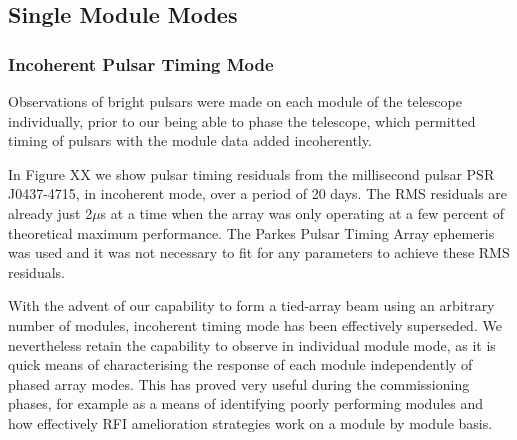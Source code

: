 \subsection{Single Module Modes}
\subsubsection{Incoherent Pulsar Timing Mode}

Observations of bright pulsars were made on each module of the telescope individually, prior to our being able to phase the telescope, which permitted timing of pulsars with the module data added incoherently. 

In Figure XX we show pulsar timing residuals from the millisecond pulsar PSR J0437-4715, in incoherent mode, over a period of 20 days. The RMS residuals are already just 2$\mu$s at a time when the array was only operating at a few percent of theoretical maximum performance. The Parkes Pulsar Timing Array ephemeris was used and it was not necessary to fit for any parameters to achieve these RMS residuals.

With the advent of our capability to form a tied-array beam using an arbitrary number of modules, incoherent timing mode has been effectively superseded. We nevertheless retain the capability to observe in individual module mode, as it is quick means of characterising the response of each module independently of phased array modes. This has proved very useful during the commissioning phases, for example as a means of identifying poorly performing modules and how effectively RFI amelioration strategies work on a module by module basis.     



  
  